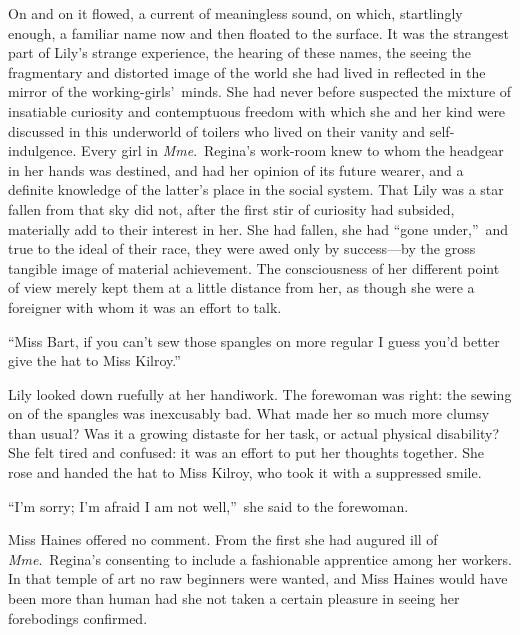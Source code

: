 \documentclass[12pt,a4paper]{book}
\begin{document}
On and on it flowed, a current of meaningless sound, on which,
startlingly enough, a familiar name now and then floated to the
surface. It was the strangest part of Lily's strange experience,
the hearing of these names, the seeing the fragmentary
and distorted image of the world she had lived in reflected in
the mirror of the working-girls'\ minds. She had never before
suspected the mixture of insatiable curiosity and contemptuous
freedom with which she and her kind were discussed in this
underworld of toilers who lived on their vanity and
self-indulgence. Every girl in \textit{Mme}.\ Regina's work-room knew to
whom the headgear in her hands was destined, and had her opinion
of its future wearer, and a definite knowledge of the latter's
place in the social system. That Lily was a star fallen from that
sky did not, after the first stir of curiosity had subsided,
materially add to their interest in her. She had fallen, she had
``gone under,''\ and true to the ideal of their race, they were awed
only by success---by the gross tangible image of material
achievement. The consciousness of her different point of view
merely kept them at a little distance from her, as though she
were a foreigner with whom it was an effort to talk.





``Miss Bart, if you can't sew those spangles on more regular I
guess you'd better give the hat to Miss Kilroy.''





Lily looked down ruefully at her handiwork. The forewoman was
right: the sewing on of the spangles was inexcusably bad. What
made her so much more clumsy than usual? Was it a growing
distaste for her task, or actual physical disability? She felt
tired and confused: it was an effort to put her thoughts
together. She rose and handed the hat to Miss Kilroy, who took it
with a suppressed smile.





``I'm sorry; I'm afraid I am not well,''\ she said to the forewoman.





Miss Haines offered no comment. From the first she had augured
ill of \textit{Mme}.\ Regina's consenting to include a fashionable
apprentice among her workers. In that temple of art no raw
beginners were wanted, and Miss Haines would have been more than
human had she not taken a certain pleasure in seeing her
forebodings confirmed.
\end{document}
